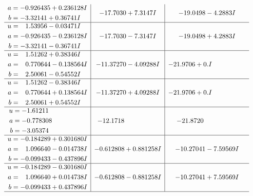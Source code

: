 \documentclass[1p]{elsarticle_modified}
\theoremstyle{definition}
\begin{document}
$$\begin{array}{c|c|c}
\begin{aligned}
a &= -0.926435 + 0.236128 I \\
b &= -3.32141 + 0.36741 I\end{aligned}
 & -17.7030 + 7.3147 I & -19.0498 - 4.2883 I \\ \hline\begin{aligned}
u &= \phantom{-}1.53956 - 0.03471 I \\
a &= -0.926435 - 0.236128 I \\
b &= -3.32141 - 0.36741 I\end{aligned}
 & -17.7030 - 7.3147 I & -19.0498 + 4.2883 I \\ \hline\begin{aligned}
u &= \phantom{-}1.51262 + 0.38346 I \\
a &= \phantom{-}0.770644 - 0.138564 I \\
b &= \phantom{-}2.50061 - 0.54552 I\end{aligned}
 & -11.37270 - 4.09288 I & -21.9706 + 0. I\phantom{ +0.000000I} \\ \hline\begin{aligned}
u &= \phantom{-}1.51262 - 0.38346 I \\
a &= \phantom{-}0.770644 + 0.138564 I \\
b &= \phantom{-}2.50061 + 0.54552 I\end{aligned}
 & -11.37270 + 4.09288 I & -21.9706 + 0. I\phantom{ +0.000000I} \\ \hline\begin{aligned}
u &= -1.61211\phantom{ +0.000000I} \\
a &= -0.778308\phantom{ +0.000000I} \\
b &= -3.05374\phantom{ +0.000000I}\end{aligned}
 & -12.1718\phantom{ +0.000000I} & -21.8720\phantom{ +0.000000I} \\ \hline\begin{aligned}
u &= -0.184289 + 0.301680 I \\
a &= \phantom{-}1.096640 - 0.014738 I \\
b &= -0.099433 - 0.437896 I\end{aligned}
 & -0.612808 + 0.881258 I & -10.27041 - 7.59569 I \\ \hline\begin{aligned}
u &= -0.184289 - 0.301680 I \\
a &= \phantom{-}1.096640 + 0.014738 I \\
b &= -0.099433 + 0.437896 I\end{aligned}
 & -0.612808 - 0.881258 I & -10.27041 + 7.59569 I\\
 \hline 
 \end{array}$$\newpage\newpage\renewcommand{\arraystretch}{1}
\end{document}
